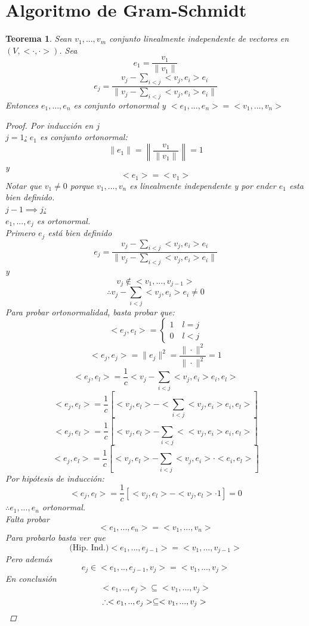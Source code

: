 \documentclass[11pt]{book}
\newtheorem{thm}{Teorema}[section]
\theoremstyle{definition}
\begin{document}
\section{Algoritmo de Gram-Schmidt}
\begin{thm}
	Sean $v_1,...,v_m$ conjunto linealmente independente de vectores en $(V,<\cdot,\cdot>)$. Sea
	\[e_1=\frac{v_1}{\|v_1\|}\]
	\[e_j=\frac{v_j-\sum_{i<j}<v_j,e_i>e_i}{\|v_j-\sum_{i<j}<v_j,e_i>e_i\|}\]
	Entonces $e_1,...,e_n$ es conjunto ortonormal y $<e_1,...,e_n>=<v_1,...,v_n>$
	\begin{proof}
		Por inducción en $j$\\
		\underline{$j=1$:} $e_1$ es conjunto ortonormal:
		\[\|e_1\|=\left\|\frac{v_1}{\|v_1\|}\right\|=1\]
		y
		\[<e_1>=<v_1>\]
		Notar que $v_1\neq 0$ porque $v_1,...,v_n$ es linealmente independente y por ender $e_1$ esta bien definido.\\
		\underline{$j-1\implies j$:}\\
		$e_1,...,e_j$ es ortonormal.\\
		Primero $e_j$ está bien definido
		\[e_j=\frac{v_j-\sum_{i<j}<v_j,e_i>e_i}{\|v_j-\sum_{i<j}<v_j,e_i>e_i\|}\]
		y
		\[v_j\notin <v_1,...,v_{j-1}>\]
		\[\therefore v_j-\sum_{i<j}<v_j,e_i>e_i\neq 0\]
		Para probar ortonormalidad, basta probar que:
		\[<e_j,e_l>=\begin{cases}
			1\quad l=j\\
			0\quad l<j
		\end{cases}\]
		\[<e_j,e_j>=\|e_j\|^2=\frac{\|\cdot\|^2}{\|\cdot\|^2}=1\]
		\[<e_j,e_l>=\frac{1}{c}<v_j-\sum_{i<j}<v_j,e_i>e_i,e_l>\]
		\[<e_j,e_l>=\frac{1}{c}\left[<v_j,e_l>-<\sum_{i<j}<v_j,e_i>e_i,e_l>\right]\]
		\[<e_j,e_l>=\frac{1}{c}\left[<v_j,e_l>-\sum_{i<j}<<v_j,e_i>e_i,e_l>\right]\]
		\[<e_j,e_l>=\frac{1}{c}\left[<v_j,e_l>-\sum_{i<j}<v_j,e_i>\cdot<e_i,e_l>\right]\]
		Por hipótesis de inducción:
		\[<e_j,e_l>=\frac{1}{c}\left[<v_j,e_l>-<v_j,e_l>\cdot 1\right]=0\]
		$\therefore e_1,...,e_n$ ortonormal.\\
		Falta probar
		\[<e_1,...,e_n>=<v_1,...,v_n>\]
		Para probarlo basta ver que\\
		\[\textrm{(Hip. Ind.)} <e_1,...,e_{j-1}>=<v_1,...,v_{j-1}>\]
		Pero además
		\[e_j\in<e_1,..,e_{j-1},v_j>=<v_1,...,v_j>\]
		En conclusión
		\[<e_1,..,e_j>\subseteq<v_1,...,v_j>\]
		\[\therefore<e_1,..,e_j>\subseteq<v_1,...,v_j>\qedhere\]
	\end{proof}
\end{thm}
\end{document}
